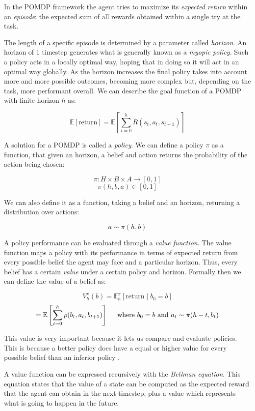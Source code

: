 In the POMDP framework the agent tries to maximize its \textit{expected return} within an
\textit{episode}: the expected sum of all rewards obtained within a single try at the task.

The length of a specific episode is determined by a parameter called \textit{horizon}. An horizon of
1 timestep generates what is generally known as a \textit{myopic policy}. Such a policy acts in a
locally optimal way, hoping that in doing so it will act in an optimal way globally. As the horizon
increases the final policy takes into account more and more possible outcomes, becoming more complex
but, depending on the task, more performant overall. We can describe the goal function of a POMDP
with finite horizon $h$ as:

\[ \mathbb{E}[\text{return}] = \mathbb{E} \left [ \sum_{t=0}^{h} R(s_t, a_t, s_{t+1}) \right ] \]

A solution for a POMDP is called a \textit{policy}. We can define a policy $\pi$ as a function, that
given an horizon, a belief and action returns the probability of the action being chosen:

\[ \pi : H \times B \times A \rightarrow [0,1] \]
\[ \pi(h, b, a) \in [0,1] \]

We can also define it as a function, taking a belief and an horizon, returning a distribution over
actions:

\[ a \sim \pi(h, b) \]

A policy performance can be evaluated through a \textit{value function}. The value function maps a
policy with its performance in terms of expected return from every possible belief the agent may
face and a particular horizon. Thus, every belief has a certain \textit{value} under a certain
policy and horizon. Formally then we can define the value of a belief as:

\[ V^\pi_{h}(b) = \mathbb{E}^\pi_h \left [\text{return} \mid b_0 = b \right ] \]
\[ = \mathbb{E} \left [\sum_{t=0}^{h} \rho(b_{t}, a_t, b_{t+1}) \right ]
    \hspace{0.5cm}\text{where }b_0 = b \text{ and }a_t \sim \pi(h-t, b_t) \]

This value is very important because it lets us compare and evaluate policies. This is because a
better policy does have a equal or higher value for every possible belief than an inferior policy
\cite{cit:suttonbarto}.

A value function can be expressed recursively with the \textit{Bellman equation}. This equation
states that the value of a state can be computed as the expected reward that the agent can obtain in
the next timestep, plus a value which represents what is going to happen in the future.

